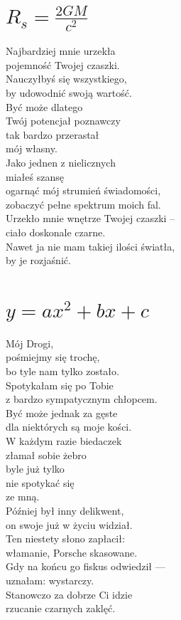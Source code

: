 \documentclass[12pt, a4paper]{memoir}
\renewenvironment{verse}{%
  \par\vspace{\baselineskip}\raggedright
}{
  \par\vspace{\baselineskip}
}
\begin{document}
\newpage
\section[Promień Schwarzschilda]{$R_s = \frac{2GM}{c^2}$}
\begin{verse}
Najbardziej mnie urzekła\\
pojemność Twojej czaszki.\\
Nauczyłbyś się wszystkiego,\\
by udowodnić swoją wartość.\\
Być może dlatego\\
Twój potencjał poznawczy\\
tak bardzo przerastał\\
mój własny.\\[\baselineskip]

Jako jednen z nielicznych\\
miałeś szansę\\
ogarnąć mój strumień świadomości,\\
zobaczyć pełne spektrum moich fal.\\[\baselineskip]

Urzekło mnie wnętrze Twojej czaszki --\\
ciało doskonale czarne.\\[\baselineskip]

Nawet ja nie mam takiej ilości światła,\\
by je rozjaśnić.
\end{verse}

\newpage
\section[Równanie kwadratowe]{$y = ax^2 + bx + c$}
\begin{verse}
Mój Drogi,\\
pośmiejmy się trochę,\\
bo tyle nam tylko zostało.\\[\baselineskip]

Spotykałam się po Tobie\\
z bardzo sympatycznym chłopcem.\\
Być może jednak za gęste\\
dla niektórych są moje kości.\\
W każdym razie biedaczek\\
złamał sobie żebro\\
byle już tylko\\
nie spotykać się\\
ze mną.\\[\baselineskip]

Później był inny delikwent,\\
on swoje już w życiu widział.\\
Ten niestety słono zapłacił:\\
włamanie, Porsche skasowane.\\
Gdy na końcu go fiskus odwiedził ---\\
uznałam: wystarczy.\\[\baselineskip]

Stanowczo za dobrze Ci idzie\\
rzucanie czarnych zaklęć.
\end{verse}
\end{document}
